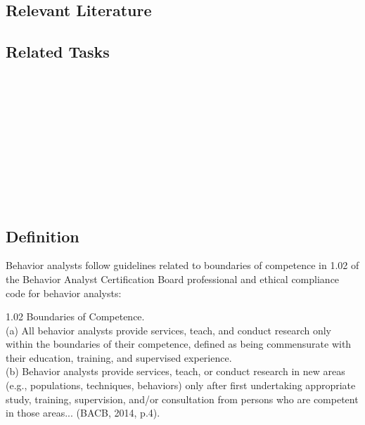 \subsection{Relevant Literature}
\begin{refsection}
\nocite{test,alang2017police,clayton2018black}
\printbibliography[heading=none]
\end{refsection}
%
\subsection{Related Tasks}
\fourgFour{}\\
\fourgSeven{}\\
\fourgEight{}\\
\fouriSix{}\\
\fourjEleven{}\\
\fourjFourteen{}\\
\fourkThree{}\\
\fourkEight{}\\
\fourkNine{}\\
%
%
%
%
%
%
\section[\fourgSeven{}]{\fourgSeven{}%
              }
\subsection{Definition}
Behavior analysts follow guidelines related to boundaries of competence in 1.02 of the Behavior Analyst Certification Board professional and ethical compliance code for behavior analysts:

1.02 Boundaries of Competence.\\
(a) All behavior analysts provide services, teach, and conduct research only within the boundaries of their competence, defined as being commensurate with their education, training, and supervised experience. \\
(b) Behavior analysts provide services, teach, or conduct research in new areas (e.g., populations, techniques, behaviors) only after first undertaking appropriate study, training, supervision, and/or consultation from persons who are competent in those areas... (BACB, 2014, p.4).\\

